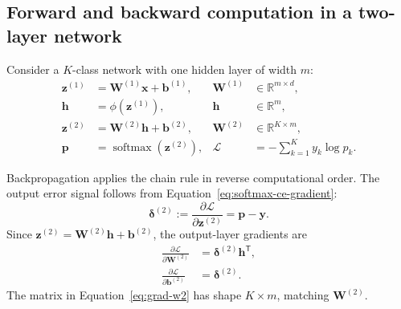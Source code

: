 \subsection{Forward and backward computation in a two-layer network}

Consider a \(K\)-class network with one hidden layer of width \(m\):
\begin{align}
    \mathbf{z}^{(1)}
    &=\mathbf{W}^{(1)}\mathbf{x}+\mathbf{b}^{(1)},
    & \mathbf{W}^{(1)}&\in\mathbb{R}^{m\times d},
    \label{eq:two-layer-z1}\\
    \mathbf{h}
    &=\phi\!\left(\mathbf{z}^{(1)}\right),
    & \mathbf{h}&\in\mathbb{R}^{m},
    \label{eq:two-layer-h}\\
    \mathbf{z}^{(2)}
    &=\mathbf{W}^{(2)}\mathbf{h}+\mathbf{b}^{(2)},
    & \mathbf{W}^{(2)}&\in\mathbb{R}^{K\times m},
    \label{eq:two-layer-z2}\\
    \mathbf{p}
    &=\operatorname{softmax}\!\left(\mathbf{z}^{(2)}\right),
    & \mathcal{L}&=-\sum_{k=1}^{K}y_k\log p_k.
    \label{eq:two-layer-output}
\end{align}

\BackpropFigure

Backpropagation applies the chain rule in reverse computational order. The output error signal follows from Equation~\eqref{eq:softmax-ce-gradient}:
\[
    \boldsymbol{\delta}^{(2)}
    :=\frac{\partial\mathcal{L}}{\partial\mathbf{z}^{(2)}}
    =\mathbf{p}-\mathbf{y}.
\]
Since \(\mathbf{z}^{(2)}=\mathbf{W}^{(2)}\mathbf{h}+\mathbf{b}^{(2)}\), the output-layer gradients are
\begin{align}
    \frac{\partial\mathcal{L}}{\partial\mathbf{W}^{(2)}}
    &=\boldsymbol{\delta}^{(2)}\mathbf{h}^{\mathsf T},
    \label{eq:grad-w2}\\
    \frac{\partial\mathcal{L}}{\partial\mathbf{b}^{(2)}}
    &=\boldsymbol{\delta}^{(2)}.
    \label{eq:grad-b2}
\end{align}
The matrix in Equation~\eqref{eq:grad-w2} has shape \(K\times m\), matching \(\mathbf{W}^{(2)}\).

